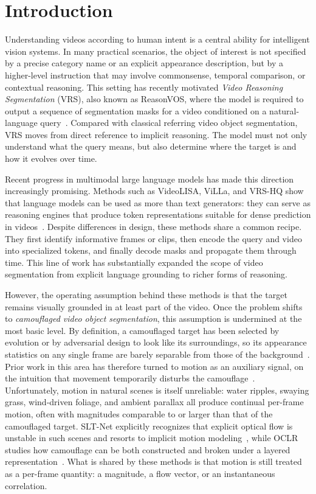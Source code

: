 \documentclass[11pt]{article}
\begin{document}
\section{Introduction}

Understanding videos according to human intent is a central ability for intelligent vision systems.
In many practical scenarios, the object of interest is not specified by a precise category name or an explicit appearance description, but by a higher-level instruction that may involve commonsense, temporal comparison, or contextual reasoning.
This setting has recently motivated \emph{Video Reasoning Segmentation} (VRS), also known as ReasonVOS, where the model is required to output a sequence of segmentation masks for a video conditioned on a natural-language query~\cite{visa}.
Compared with classical referring video object segmentation, VRS moves from direct reference to implicit reasoning.
The model must not only understand what the query means, but also determine where the target is and how it evolves over time.

Recent progress in multimodal large language models has made this direction increasingly promising.
Methods such as VideoLISA, ViLLa, and VRS-HQ show that language models can be used as more than text generators: they can serve as reasoning engines that produce token representations suitable for dense prediction in videos~\cite{videolisa,villa,vrshq}.
Despite differences in design, these methods share a common recipe.
They first identify informative frames or clips, then encode the query and video into specialized tokens, and finally decode masks and propagate them through time.
This line of work has substantially expanded the scope of video segmentation from explicit language grounding to richer forms of reasoning.

However, the operating assumption behind these methods is that the target remains visually grounded in at least part of the video.
Once the problem shifts to \emph{camouflaged video object segmentation}, this assumption is undermined at the most basic level.
By definition, a camouflaged target has been selected by evolution or by adversarial design to look like its surroundings, so its appearance statistics on any single frame are barely separable from those of the background~\cite{cod10k}.
Prior work in this area has therefore turned to motion as an auxiliary signal, on the intuition that movement temporarily disturbs the camouflage~\cite{sltnet,moca}.
Unfortunately, motion in natural scenes is itself unreliable: water ripples, swaying grass, wind-driven foliage, and ambient parallax all produce continual per-frame motion, often with magnitudes comparable to or larger than that of the camouflaged target.
SLT-Net explicitly recognizes that explicit optical flow is unstable in such scenes and resorts to implicit motion modeling~\cite{sltnet}, while OCLR studies how camouflage can be both constructed and broken under a layered representation~\cite{oclrv}.
What is shared by these methods is that motion is still treated as a per-frame quantity: a magnitude, a flow vector, or an instantaneous correlation.
\end{document}
